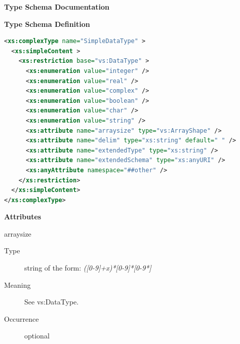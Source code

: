 \documentclass[11pt,a4paper]{ivoa}
\begin{document}
\begin{generated}
\begingroup
      	\renewcommand*\descriptionlabel[1]{%
      	\hbox to 5.5em{\emph{#1}\hfil}}\vspace{2ex}\noindent\textbf{ Type Schema Documentation}



\vspace{1ex}\noindent\textbf{ Type Schema Definition}

\begin{lstlisting}[language=XML,basicstyle=\footnotesize]
<xs:complexType name="SimpleDataType" >
  <xs:simpleContent >
    <xs:restriction base="vs:DataType" >
      <xs:enumeration value="integer" />
      <xs:enumeration value="real" />
      <xs:enumeration value="complex" />
      <xs:enumeration value="boolean" />
      <xs:enumeration value="char" />
      <xs:enumeration value="string" />
      <xs:attribute name="arraysize" type="vs:ArrayShape" />
      <xs:attribute name="delim" type="xs:string" default=" " />
      <xs:attribute name="extendedType" type="xs:string" />
      <xs:attribute name="extendedSchema" type="xs:anyURI" />
      <xs:anyAttribute namespace="##other" />
    </xs:restriction>
  </xs:simpleContent>
</xs:complexType>
\end{lstlisting}

\vspace{0.5ex}\noindent\textbf{ Attributes}

\begingroup\small\begin{bigdescription}
\item[arraysize]
\begin{description}
\item[Type] string of the form: \emph{([0-9]+x)*[0-9]*[0-9*]}
\item[Meaning] See vs:DataType.
\item[Occurrence] optional


\end{description}
\end{bigdescription}
\end{generated}
\end{document}
